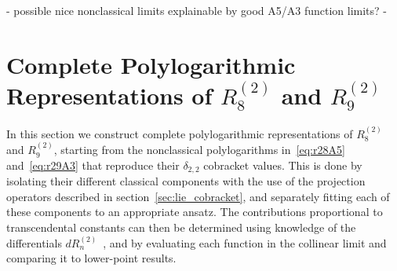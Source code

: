 \documentclass[11pt]{article}
\DeclareMathOperator{\Gr}{Gr}
\def\pdfeq#1{\texorpdfstring{$#1$}{a}}
\begin{document}
\vspace{2cm}

- possible nice nonclassical limits explainable by good A5/A3 function limits?
- 




\section{Complete Polylogarithmic Representations of \pdfeq{R_8^{(2)}} and \pdfeq{R_9^{(2)}}}
\label{sec:r28_and_r29}

In this section we construct complete polylogarithmic representations of $R_8^{(2)}$\! and $R_9^{(2)}$\!, starting from the nonclassical polylogarithms in~\eqref{eq:r28A5} and~\eqref{eq:r29A3} that reproduce their $\delta_{2,2}$ cobracket values. This is done by isolating their different classical components with the use of the projection operators described in section~\ref{sec:lie_cobracket}, and separately fitting each of these components to an appropriate ansatz.
The contributions proportional to transcendental constants can then be determined using knowledge of the differentials $dR_n^{(2)}$\!~\cite{CaronHuot:2011ky,Golden:2013lha}, and by evaluating each function in the collinear limit and comparing it to lower-point results.


\end{document}
